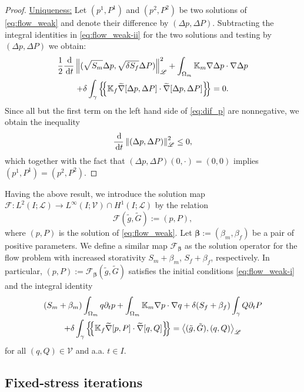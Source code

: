 \documentclass[a4paper]{article}
\numberwithin{equation}{section}
\def\agrad{\widetilde\nabla}
\def\avg#1{\left\{\mskip-5mu\left\{#1\right\}\mskip-5mu\right\}}
\def\bbeta{\boldsymbol{\beta}}
\def\d {\,{\rm d}}
\def\ddt#1{\frac{\d #1}{\d t}}
\def\dt{\prtl_t}
\def\dual#1#2{\left\langle #1,#2\right\rangle}
\def\Hf{\mathscr{L}} %
\def\norm#1{\left\|#1\right\|}
\def\prtl{\partial}
\def\tn#1{{\mathbb{#1}}}    %
\def\Vf{{\mathcal V}} %
\newcommand{\eqs}[1]{\begin{equation*}#1\end{equation*}}
\newcommand{\ml}[1]{\begin{multline}#1\end{multline}}
\begin{document}
\begin{proof}
\underline{Uniqueness:}
Let $(p^1,P^1)$ and $(p^2,P^2)$ be two solutions of \eqref{eq:flow_weak} and denote their difference by $(\Delta p,\Delta P)$.
Subtracting the integral identities in \eqref{eq:flow_weak-ii} for the two solutions and testing by $(\Delta p,\Delta P)$ we obtain:
\ml{ \label{eq:dif_p} \frac12\ddt{}\norm{(\sqrt{S_m}\Delta p,\sqrt{\delta S_f}\Delta P)}_\Hf^2
+ \int_{\Omega_m}\tn K_m\nabla\Delta p\cdot\nabla\Delta p\\
+ \delta\int_\gamma\avg{\tn K_f\agrad[\Delta p,\Delta P]\cdot\agrad[\Delta p,\Delta P]} = 0. }
Since all but the first term on the left hand side of \eqref{eq:dif_p} are nonnegative, we obtain the inequality
\eqs{ \ddt{}\norm{(\Delta p,\Delta P)}_\Hf^2 \le 0, }
which together with the fact that $(\Delta p,\Delta P)(0,\cdot) = (0,0)$ implies $(p^1,P^1)=(p^2,P^2)$.
\end{proof}
% 
Having the above result, we introduce the solution map $\mathcal F:L^2( I;\Hf)\to L^\infty( I;\Vf)\cap H^1( I;\Hf)$ by the relation
\eqs{ \mathcal F(\tilde g,\tilde G) := (p,P), }
where $(p,P)$ is the solution of \eqref{eq:flow_weak}.
Let $\bbeta:=(\beta_m,\beta_f)$ be a pair of positive parameters.
We define a similar map $\mathcal F_{\bbeta}$ as the solution operator for the flow problem with increased storativity $S_m+\beta_m$, $S_f+\beta_f$, respectively.
In particular, $(p,P):=\mathcal F_{\bbeta}(\tilde g,\tilde G)$ satisfies the initial conditions 
\eqref{eq:flow_weak-i} and the integral identity
\ml{ \label{eq:flow_problem_beta} (S_m+\beta_m)\int_{\Omega_m} q\dt p + \int_{\Omega_m}\tn K_m\nabla p\cdot\nabla q + \delta (S_f+\beta_f)\int_\gamma Q\dt P\\
+ \delta\int_\gamma\avg{\tn K_f\agrad[p,P]\cdot\agrad[q,Q]}
= \dual{(\tilde g,\tilde G)}{(q,Q)}_\Hf }
for all $(q,Q)\in\Vf$ and a.a. $t\in I$.



\subsection{Fixed-stress iterations}\label{sec:iter}
\end{document}
